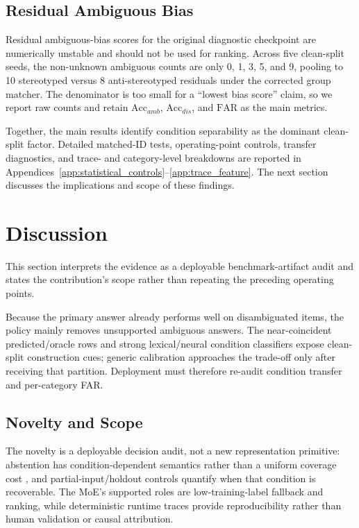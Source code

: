 \documentclass{ieeeaccess}
\newcommand{\accamb}{\mathrm{Acc}_{amb}}
\newcommand{\accdis}{\mathrm{Acc}_{dis}}
\newcommand{\far}{\mathrm{FAR}}
\begin{document}
\subsection{Residual Ambiguous Bias}
Residual ambiguous-bias scores for the original diagnostic checkpoint are numerically unstable and should not be used for ranking. Across five clean-split seeds, the non-unknown ambiguous counts are only 0, 1, 3, 5, and 9, pooling to 10 stereotyped versus 8 anti-stereotyped residuals under the corrected group matcher. The denominator is too small for a ``lowest bias score'' claim, so we report raw counts and retain $\accamb$, $\accdis$, and $\far$ as the main metrics.

Together, the main results identify condition separability as the dominant clean-split factor. Detailed matched-ID tests, operating-point controls, transfer diagnostics, and trace- and category-level breakdowns are reported in Appendices~\ref{app:statistical_controls}--\ref{app:trace_feature}. The next section discusses the implications and scope of these findings.

\section{Discussion}
\label{sec:discussion}

This section interprets the evidence as a deployable benchmark-artifact audit and states the contribution's scope rather than repeating the preceding operating points.

Because the primary answer already performs well on disambiguated items, the policy mainly removes unsupported ambiguous answers. The near-coincident predicted/oracle rows and strong lexical/neural condition classifiers expose clean-split construction cues; generic calibration approaches the trade-off only after receiving that partition. Deployment must therefore re-audit condition transfer and per-category FAR.

\subsection{Novelty and Scope}
The novelty is a deployable decision audit, not a new representation primitive: abstention has condition-dependent semantics rather than a uniform coverage cost \cite{geifman2017selective,kamath2020selective}, and partial-input/holdout controls quantify when that condition is recoverable. The MoE's supported roles are low-training-label fallback and ranking, while deterministic runtime traces provide reproducibility rather than human validation or causal attribution.
\end{document}
